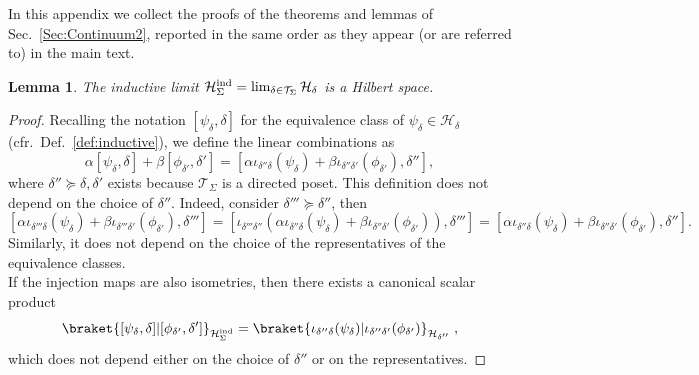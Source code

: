 \documentclass[11pt]{article}
\newcommand{\Hil}{\mathcal{H}}
\newcommand{\Hind}{\mathcal{H}_{\Sigma}^{\rm ind}}
\newcommand{\h}{\mathcal{H}}
\newtheorem{lemma}[proposition]{Lemma}
\theoremstyle{definition}
\numberwithin{equation}{section}
\begin{document}
In this appendix we collect the proofs of the theorems and lemmas of Sec.~\ref{Sec:Continuum2}, reported in the same order as they appear (or are referred to) in the main text.

\begin{lemma}\label{rm:lim} The inductive limit $\h_{\Sigma}^{\rm ind}=\lim_{\delta\in\mathcal{T}_{\Sigma}}\h_{\delta}$ is a Hilbert space.
\end{lemma}
\begin{proof}
    Recalling the notation $[\psi_\delta,\delta]$ for the equivalence class of $\psi_\delta\in\h_\delta$ (cfr.~Def.~\ref{def:inductive}), we define the linear combinations as
    \[\alpha [\psi_\delta,\delta]+\beta[\phi_{\delta'},\delta']=[\alpha \iota_{\delta''\delta}(\psi_{\delta})+\beta \iota_{\delta''\delta'}(\phi_{\delta'}),\delta''],\]
    where $\delta''\succeq\delta,\delta'$ exists because $\mathcal{T}_{\Sigma}$ is a directed poset. This definition does not depend on the choice of $\delta''$. Indeed, consider $\delta'''\succeq\delta''$, then
    \[[\alpha \iota_{\delta'''\delta}(\psi_{\delta})+\beta \iota_{\delta'''\delta'}(\phi_{\delta'}),\delta''']=[\iota_{\delta'''\delta''}(\alpha \iota_{\delta''\delta}(\psi_{\delta})+\beta \iota_{\delta''\delta'}(\phi_{\delta'})),\delta''']=[\alpha \iota_{\delta''\delta}(\psi_{\delta})+\beta \iota_{\delta''\delta'}(\phi_{\delta'}),\delta''].\]
    Similarly, it does not depend on the choice of the representatives of the equivalence classes.\\
    If the injection maps are also isometries, then there exists a canonical scalar product
    \[\braket{[\psi_{\delta},\delta]|[\phi_{\delta'},\delta']}_{\Hind}=\braket{\iota_{\delta''\delta}(\psi_{\delta})|\iota_{\delta''\delta'}(\phi_{\delta'})}_{\Hil_{\delta''}}\;,\]
    which does not depend either on the choice of $\delta''$ or on the representatives.
\end{proof}
\end{document}

